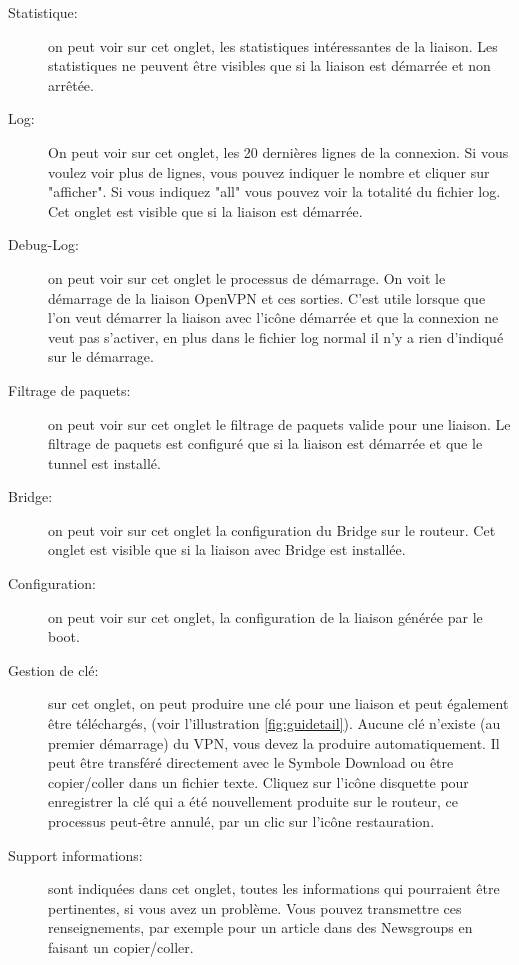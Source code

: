 \begin{description}
\item [Statistique:] on peut voir sur cet onglet, les statistiques
    intéressantes de la liaison. Les statistiques ne peuvent être visibles
    que si la liaison est démarrée et non arrêtée.

\item [Log:] On peut voir sur cet onglet, les 20 dernières lignes de la
    connexion. Si vous voulez voir plus de lignes, vous pouvez indiquer
    le nombre et cliquer sur "afficher". Si vous indiquez "all" vous
    pouvez voir la totalité du fichier log. Cet onglet est visible que
    si la liaison est démarrée.

\item [Debug-Log:] on peut voir sur cet onglet le processus de démarrage.
    On voit le démarrage de la liaison OpenVPN et ces sorties. C'est
    utile lorsque que l'on veut démarrer la liaison avec l'icône démarrée
    et que la connexion ne veut pas s'activer, en plus dans le fichier log
    normal il n'y a rien d'indiqué sur le démarrage.

\item [Filtrage de paquets:] on peut voir sur cet onglet le filtrage de paquets
    valide pour une liaison. Le filtrage de paquets est configuré que si
    la liaison est démarrée et que le tunnel est installé.

\item [Bridge:] on peut voir sur cet onglet la configuration du Bridge sur
    le routeur. Cet onglet est visible que si la liaison avec Bridge est
    installée.

\item [Configuration:] on peut voir sur cet onglet, la configuration de la
    liaison générée par le boot.

\item [Gestion de clé:] sur cet onglet, on peut produire une clé pour une
    liaison et peut également être téléchargés, (voir l'illustration
    \ref{fig:guidetail}). Aucune clé n'existe (au premier démarrage) du VPN,
    vous devez la produire automatiquement. Il peut être transféré directement
    avec le Symbole Download ou être copier/coller dans un fichier texte.
    Cliquez sur l'icône disquette pour enregistrer la clé qui a été nouvellement
    produite sur le routeur, ce processus peut-être annulé, par un clic sur
    l'icône restauration.

\item [Support informations:] sont indiquées dans cet onglet, toutes les
    informations qui pourraient être pertinentes, si vous avez un problème. Vous
    pouvez transmettre ces renseignements, par exemple pour un article
    dans des Newsgroups en faisant un copier/coller.

\end{description}


